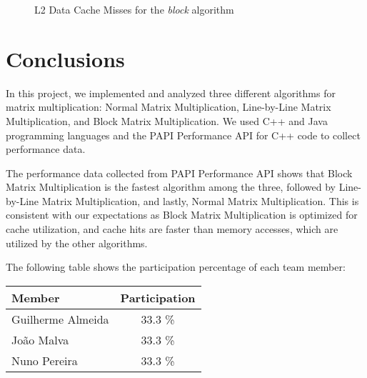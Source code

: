\documentclass[11pt,a4paper]{article}
\begin{document}
\begin{figure}[H]
    \centering
    \caption{L2 Data Cache Misses for the \emph{block} algorithm}
\end{figure}

\section{Conclusions}

In this project, we implemented and analyzed three different algorithms for matrix multiplication: Normal Matrix Multiplication, Line-by-Line Matrix Multiplication, and Block Matrix Multiplication. We used C++ and Java programming languages and  the PAPI Performance API for C++ code to collect performance data.

The performance data collected from PAPI Performance API shows that Block Matrix Multiplication is the fastest algorithm among the three, followed by Line-by-Line Matrix Multiplication, and lastly, Normal Matrix Multiplication. This is consistent with our expectations as Block Matrix Multiplication is optimized for cache utilization, and cache hits are faster than memory accesses, which are utilized by the other algorithms.

The following table shows the participation percentage of each team member:




\begin{table}[H]
    \centering
    \begin{tabular}{||l c||} 
        \hline
        Member & Participation \\ [0.5ex] 
        \hline\hline
        Guilherme Almeida & 33.3 \% \\
        João Malva & 33.3 \% \\
        Nuno Pereira & 33.3 \% \\
        \hline
    \end{tabular}
\end{table}
\end{document}
